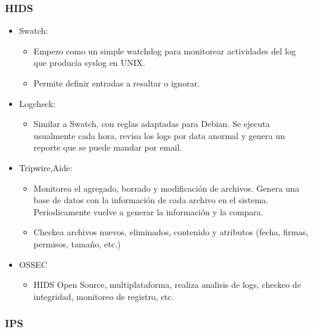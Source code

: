 \subsubsection{HIDS}

\begin{itemize}
	\item Swatch: \begin{itemize}
		\item Empezo como un simple watchdog para monitorear actividades del log que producía syslog en UNIX.
		\item Permite definir entradas a resaltar o ignorar.
	\end{itemize}
	\item Logcheck: \begin{itemize}
		\item Similar a Swatch, con reglas adaptadas para Debian. Se ejecuta usualmente cada hora, revisa los logs
		por data anormal y genera un reporte que se puede mandar por email.
	\end{itemize}
	\item Tripwire,Aide: \begin{itemize}
		\item Monitorea el agregado, borrado y modificación de archivos. Genera una base de datos con la información
		de cada archivo en el sistema. Periodicamente vuelve a generar la información y la compara.
		\item Checkea archivos nuevos, eliminados, contenido y atributos (fecha, firmas, permisos, tamaño, etc.)
	\end{itemize}
	\item OSSEC \begin{itemize}
		\item HIDS Open Source, multiplataforma, realiza analisis de logs, checkeo de integridad, monitoreo de registro, etc.
	\end{itemize}
\end{itemize}

\subsubsection{IPS}

